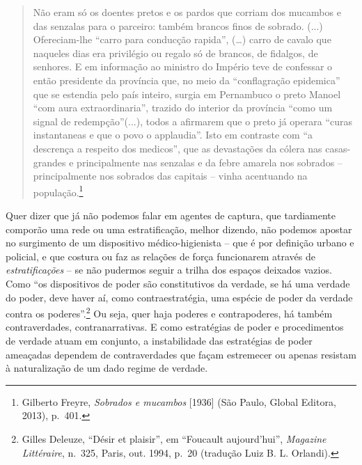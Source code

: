 \begin{quote}
Não eram só os doentes pretos e os pardos que corriam dos mucambos e das
senzalas para o parceiro: também brancos finos de sobrado. (...)
Ofereciam-lhe ``carro para conducção rapida'', (\ldots{}) carro de
cavalo que naqueles dias era privilégio ou regalo só de brancos, de
fidalgos, de senhores. E em informação ao ministro do Império teve de
confessar o então presidente da província que, no meio da ``conflagração
epidemica'' que se estendia pelo país inteiro, surgia em Pernambuco o
preto Manoel ``com aura extraordinaria'', trazido do interior da
província ``como um signal de redempção''(...), todos a afirmarem que o
preto já operara ``curas instantaneas e que o povo o applaudia''. Isto
em contraste com ``a descrença a respeito dos medicos'', que as
devastações da cólera nas casas-grandes e principalmente nas senzalas e
da febre amarela nos sobrados -- principalmente nos sobrados das
capitais -- vinha acentuando na população.\footnote{Gilberto Freyre,
  \emph{Sobrados e mucambos} {[}1936{]} (São Paulo, Global Editora,
  2013), p.~401.}
\end{quote}

Quer dizer que já não podemos falar em agentes de captura, que
tardiamente comporão uma rede ou uma estratificação, melhor dizendo, não
podemos apostar no surgimento de um dispositivo médico-higienista -- que
é por definição urbano e policial, e que costura ou faz as relações de
força funcionarem através de \emph{estratificações} -- se não pudermos
seguir a trilha dos espaços deixados vazios. Como ``os dispositivos de
poder são constitutivos da verdade, se há uma verdade do poder, deve
haver aí, como contraestratégia, uma espécie de poder da verdade contra
os poderes''.\footnote{Gilles Deleuze, ``Désir et plaisir'', em
  ``Foucault aujourd'hui'', \emph{Magazine Littéraire}, n.~325, Paris,
  out. 1994, p.~20 (tradução Luiz B. L. Orlandi).} Ou seja, quer haja
poderes e contrapoderes, há também contraverdades, contranarrativas. E
como estratégias de poder e procedimentos de verdade atuam em conjunto,
a instabilidade das estratégias de poder ameaçadas dependem de
contraverdades que façam estremecer ou apenas resistam à naturalização
de um dado regime de verdade.

